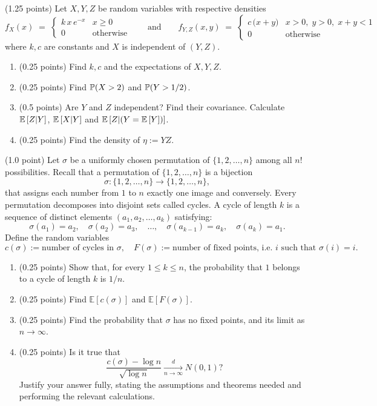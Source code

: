 \documentclass[a4paper]{report}
\begin{document}
\begin{problem} (1.25 points)
Let $X,Y,Z$ be random variables with respective densities
\[
f_X(x) \;=\;
\begin{cases}
k \, x \, e^{-x} & x \ge 0\\
0 & \text{otherwise}
\end{cases}
\qquad
\text{and}
\qquad
f_{Y,Z}(x,y) \;=\;
\begin{cases}
c\,\bigl(x + y\bigr) & x>0,\; y>0,\; x+y<1\\
0 & \text{otherwise}
\end{cases}
\]
where $k,c$ are constants and $X$ is independent of $(Y,Z)$.
\begin{enumerate}
    \item (0.25 points) Find $k,c$ and the expectations of $X,Y,Z$.
    \item (0.25 points) Find $\P(X>2)$ and $\P(Y>1/2)$.
    \item (0.5 points) Are $Y$ and $Z$ independent? Find their covariance. Calculate $
\Ebb{Z|Y}$, $\Ebb{X|Y}$ and $\Ebb{Z|(Y=\Ebb{Y})}$.
    \item (0.25 points) Find the density of $\eta:=YZ$.
\end{enumerate}
\end{problem}





\begin{problem}(1.0 point)
Let $\sigma$ be a uniformly chosen permutation of $\{1,2,\ldots,n\}$ among all $n!$ possibilities. Recall that a permutation of $\{1,2,\ldots,n\}$ is a bijection
    \[
    \sigma:\{1,2,\ldots,n\}\to\{1,2,\ldots,n\},
    \]
that assigns each number from $1$ to $n$ exactly one image and conversely. Every permutation decomposes into disjoint sets called cycles. A cycle of length $k$ is a sequence of distinct elements $(a_1,a_2,\dots,a_k)$ satisfying:
    \[
    \sigma(a_1)=a_2,\quad \sigma(a_2)=a_3,\quad \dots,\quad \sigma(a_{k-1})=a_k,\quad \sigma(a_k)=a_1.
    \]
Define the random variables
\[
c(\sigma):=\text{number of cycles in }\sigma,
\quad
F(\sigma):=\text{number of fixed points, i.e. $i$ such that $\sigma(i)=i$.}
\]
\begin{enumerate}
    \item (0.25 points) Show that, for every $1\leq k\leq n$, the probability that $1$ belongs to a cycle of length $k$ is $1/n$.
    \item (0.25 points) Find $\mathbb E[c(\sigma)]$ and $\mathbb E[F(\sigma)]$.
    \item (0.25 points) Find the probability that $\sigma$ has no fixed points, and its limit as $n\to\infty$.
    \item (0.25 points) Is it true that
    \[
    \frac{c(\sigma)-\log n}{\sqrt{\log n}} \xrightarrow[n\to\infty]{d} N(0,1)?
    \]
    Justify your answer fully, stating the assumptions and theorems needed and performing the relevant calculations.
\end{enumerate}
\end{problem}
\end{document}
